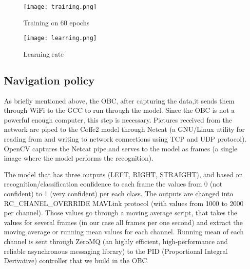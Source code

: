 \documentclass[conference]{IEEEtran}
\begin{document}
\begin{figure}
      \centering
      \texttt{[image: training.png]}
      \caption{Training on 60 epochs}
      \label{fig:robot1}
\end{figure}

\begin{figure}
      \centering
      \texttt{[image: learning.png]}
      \caption{Learning rate}
      \label{fig:robot1}
\end{figure}

\subsection{Navigation policy}

As briefly mentioned above, the OBC, after capturing the data,it sends them through WiFi to the GCC to run through the model. Since the OBC is not a powerful enough computer, this step is necessary. Pictures received from the network are piped to the Coffe2 model through Netcat (a GNU/Linux utility for reading from and writing to network connections using TCP and UDP protocol). OpenCV captures the Netcat pipe and serves to the model as frames (a single image where the model performs the recognition).

The model that has three outputs (LEFT, RIGHT, STRAIGHT), and based on recognition/classification confidence to each frame the values from 0 (not confident) to 1 (very confident) per each class. The outputs are changed into RC\_CHANEL\_OVERRIDE MAVLink protocol (with values from 1000 to 2000 per channel). Those values go through a moving average script, that takes the values for several frames (in our case all frames per one second) and extract the moving average or running mean values for each channel. Running mean of each channel is sent through ZeroMQ (an highly efficient, high-performance and reliable asynchronous messaging library) to the PID (Proportional Integral Derivative) controller that we build in the OBC.
\end{document}
